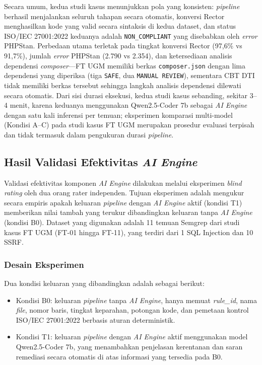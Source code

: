 Secara umum, kedua studi kasus menunjukkan pola yang konsisten: 
\textit{pipeline} berhasil menjalankan seluruh tahapan secara otomatis, 
konversi Rector menghasilkan kode yang valid secara sintaksis di kedua 
dataset, dan status ISO/IEC 27001:2022 keduanya adalah \texttt{NON\_COMPLIANT} 
yang disebabkan oleh \textit{error} PHPStan. Perbedaan utama terletak pada tingkat konversi Rector (97{,}6\% vs
91{,}7\%), jumlah \textit{error} PHPStan (2.790 vs 2.354), dan
ketersediaan analisis dependensi \textit{composer}---FT UGM memiliki
berkas \texttt{composer.json} dengan lima dependensi yang diperiksa
(tiga \texttt{SAFE}, dua \texttt{MANUAL REVIEW}), sementara CBT DTI
tidak memiliki berkas tersebut sehingga langkah analisis dependensi
dilewati secara otomatis. Dari sisi durasi eksekusi, kedua studi kasus
sebanding, sekitar 3--4 menit, karena keduanya menggunakan
Qwen2.5-Coder 7b sebagai \textit{AI Engine} dengan satu kali inferensi
per temuan; eksperimen komparasi multi-model (Kondisi A--C) pada
studi kasus FT UGM merupakan prosedur evaluasi terpisah dan tidak
termasuk dalam pengukuran durasi \textit{pipeline}.

\subsection{Hasil Validasi Efektivitas \textit{AI Engine}}
\label{sec:validasi-ai-engine}

Validasi efektivitas komponen \textit{AI Engine} dilakukan melalui
eksperimen \textit{blind rating} oleh dua orang rater independen.
Tujuan eksperimen adalah mengukur secara empiris apakah keluaran
\textit{pipeline} dengan \textit{AI Engine} aktif (kondisi T1)
memberikan nilai tambah yang terukur dibandingkan keluaran tanpa
\textit{AI Engine} (kondisi B0). Dataset yang digunakan adalah 11
temuan Semgrep dari studi kasus FT UGM (FT-01 hingga FT-11), yang
terdiri dari 1 SQL Injection dan 10 SSRF.

\subsubsection{Desain Eksperimen}

Dua kondisi keluaran yang dibandingkan adalah sebagai berikut:
\begin{itemize}
    \item Kondisi B0: keluaran \textit{pipeline} tanpa
    \textit{AI Engine}, hanya memuat \textit{rule\_id}, nama
    \textit{file}, nomor baris, tingkat keparahan, potongan kode,
    dan pemetaan kontrol ISO/IEC 27001:2022 berbasis aturan
    deterministik.
    \item Kondisi T1: keluaran \textit{pipeline} dengan
    \textit{AI Engine} aktif menggunakan model Qwen2.5-Coder 7b,
    yang menambahkan penjelasan kerentanan dan saran remediasi
    secara otomatis di atas informasi yang tersedia pada B0.
\end{itemize}


